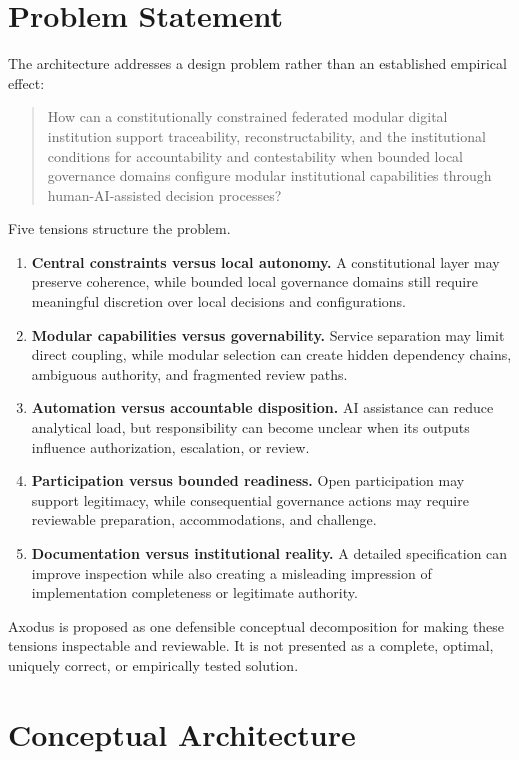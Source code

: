 \documentclass[11pt]{article}
\begin{document}
\section{Problem Statement}

The architecture addresses a design problem rather than an established
empirical effect:

\begin{quote}
How can a constitutionally constrained federated modular digital institution
support traceability, reconstructability, and the institutional conditions
for accountability and contestability when bounded local governance domains
configure modular institutional capabilities through human-AI-assisted
decision processes?
\end{quote}

Five tensions structure the problem.

\begin{enumerate}[leftmargin=*]
\item \textbf{Central constraints versus local autonomy.} A constitutional
layer may preserve coherence, while bounded local governance domains still
require meaningful discretion over local decisions and configurations.
\item \textbf{Modular capabilities versus governability.} Service separation
may limit direct coupling, while modular selection can create hidden
dependency chains, ambiguous authority, and fragmented review paths.
\item \textbf{Automation versus accountable disposition.} AI assistance can
reduce analytical load, but responsibility can become unclear when its
outputs influence authorization, escalation, or review.
\item \textbf{Participation versus bounded readiness.} Open participation may
support legitimacy, while consequential governance actions may require
reviewable preparation, accommodations, and challenge.
\item \textbf{Documentation versus institutional reality.} A detailed
specification can improve inspection while also creating a misleading
impression of implementation completeness or legitimate authority.
\end{enumerate}

Axodus is proposed as one defensible conceptual decomposition for making these
tensions inspectable and reviewable. It is not presented as a complete,
optimal, uniquely correct, or empirically tested solution.

\section{Conceptual Architecture}
\end{document}
